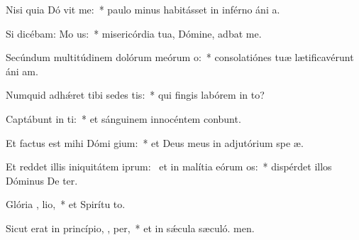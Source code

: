 \item Nisi quia Dó vit me:~* paulo minus habitásset in inférno áni a.
\item Si dicébam: Mo   us:~* misericórdia tua, Dómine, adbat me.
\item Secúndum multitúdinem dolórum meórum   o:~* consolatiónes tuæ lætificavérunt áni am.
\item Numquid adhǽret tibi sedes tis:~* qui fingis labórem in to?
\item Captábunt in  ti:~* et sánguinem innocéntem conbunt.
\item Et factus est mihi Dómi  gium:~* et Deus meus in adjutórium spe æ.
\item Et reddet illis iniquitátem iprum:~\pscross{} et in malítia eórum  os:~* dispérdet illos Dóminus De ter.
\item Glória ,  lio,~* et Spirítu to.
\item Sicut erat in princípio,  ,  per,~* et in sǽcula sæculó. men.
